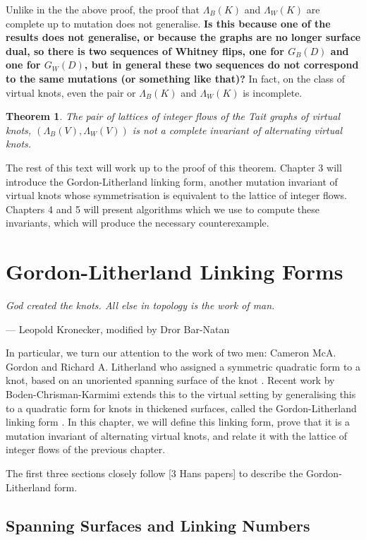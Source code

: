 \documentclass[12pt]{report}
\newcommand{\notered}[1]{{\color{Red} \textbf{#1}}}
\newtheorem*{theorem}{Theorem}
\begin{document}
Unlike in the the above proof, the proof that $\Lambda_{B}(K)$ and $\Lambda_{W}(K)$ are complete up to mutation does not generalise. \notered{Is this because one of the results does not generalise, or because the graphs are no longer surface dual, so there is two sequences of Whitney flips, one for $G_{B}(D)$ and one for $G_{W}(D)$, but in general these two sequences do not correspond to the same mutations (or something like that)?} In fact, on the class of virtual knots, even the pair or $\Lambda_{B}(K)$ and $\Lambda_{W}(K)$ is incomplete.

\begin{theorem}
The pair of lattices of integer flows of the Tait graphs of virtual knots, $(\Lambda_{B}(V), \Lambda_{W}(V))$ is not a complete invariant of alternating virtual knots.
\end{theorem}

The rest of this text will work up to the proof of this theorem. Chapter 3 will introduce the Gordon-Litherland linking form, another mutation invariant of virtual knots whose symmetrisation is equivalent to the lattice of integer flows. Chapters 4 and 5 will present algorithms which we use to compute these invariants, which will produce the necessary counterexample.


\chapter{Gordon-Litherland Linking Forms}

\epigraph{\itshape God created the knots. All else in topology is the work of man.}{--- Leopold Kronecker, modified by Dror Bar-Natan}

In particular, we turn our attention to the work of two men: Cameron McA. Gordon and Richard A. Litherland who assigned a symmetric quadratic form to a knot, based on an unoriented spanning surface of the knot \cite{signature-of-a-link}. Recent work by Boden-Chrisman-Karmimi extends this to the virtual setting by generalising this to a quadratic form for knots in thickened surfaces, called the Gordon-Litherland linking form \cite{gordon-litherland-pairing-thickened-surfaces}. In this chapter, we will define this linking form, prove that it is a mutation invariant of alternating virtual knots, and relate it with the lattice of integer flows of the previous chapter.

The first three sections closely follow [3 Hans papers] to describe the Gordon-Litherland form.

\section{Spanning Surfaces and Linking Numbers}
\end{document}
